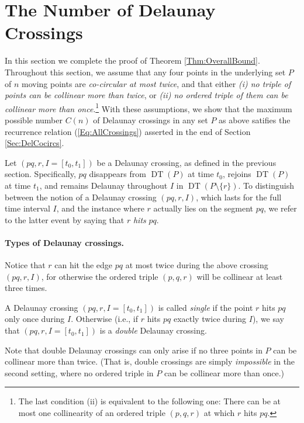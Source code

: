 \documentclass[letter,11pt]{article}
\def\DT{\mathop{\mathrm{DT}}}
\begin{document}
\section{The Number of Delaunay Crossings}\label{Sec:CrossOnce}

In this section we complete the proof of Theorem \ref{Thm:OverallBound}. 
Throughout this section, we assume that any four points in the underlying set $P$ of $n$ moving points are {\it co-circular at most twice}, and that either {\it (i) no triple of points can be collinear more than twice}, or {\it (ii) no ordered triple of them can be collinear more than once}.\footnote{The last condition (ii) is equivalent to the following one: There can be at most one collinearity of an ordered triple $(p,q,r)$ at which $r$ hits $pq$.}
With these assumptions, we show that the maximum possible number $C(n)$ of Delaunay crossings in any set $P$ as above satifies
the recurrence relation (\ref{Eq:AllCrossings}) asserted in the end of Section \ref{Sec:DelCocircs}.



  
Let $(pq,r,I=[t_0,t_1])$ be a Delaunay crossing, as defined in the previous section. Specifically, $pq$ disappears from $\DT(P)$ at time $t_0$, rejoins $\DT(P)$ at time $t_1$, and remains Delaunay throughout $I$ in $\DT(P\setminus \{r\})$. To distinguish between the notion of a Delaunay crossing $(pq,r,I)$, which lasts for the full time interval $I$, and the instance where $r$ actually lies on the segment $pq$, we refer to the latter event by saying that $r$ {\it hits} $pq$.

\paragraph{Types of Delaunay crossings.}
Notice that $r$ can hit the edge $pq$ at most twice during the above crossing $(pq,r,I)$, for otherwise the ordered triple $(p,q,r)$ will be collinear at least three times.

A Delaunay crossing $(pq,r,I=[t_0,t_1])$ is called {\it single} if the point $r$ hits $pq$ only once during $I$.
Otherwise (i.e., if $r$ hits $pq$ exactly twice during $I$), we say that $(pq,r,I=[t_0,t_1])$ is a {\it double} Delaunay crossing. 

Note that double Delaunay crossings can only arise if no three points in $P$ can be collinear more than twice. (That is, double crossings are simply {\it impossible} in the second setting, where no ordered triple in $P$ can be collinear more than once.)
\end{document}
